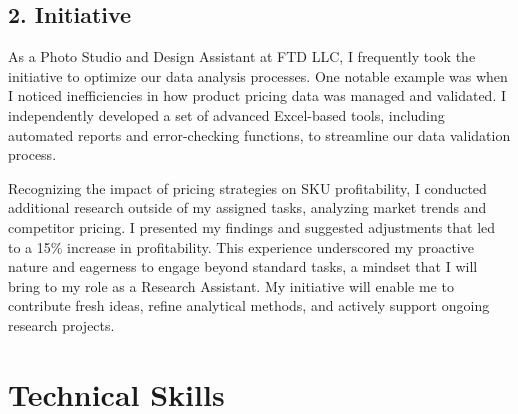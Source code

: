 \documentclass{article}
\begin{document}
\subsection*{2. Initiative}
As a Photo Studio and Design Assistant at FTD LLC, I frequently took the initiative to optimize our data analysis processes. One notable example was when I noticed inefficiencies in how product pricing data was managed and validated. I independently developed a set of advanced Excel-based tools, including automated reports and error-checking functions, to streamline our data validation process.

Recognizing the impact of pricing strategies on SKU profitability, I conducted additional research outside of my assigned tasks, analyzing market trends and competitor pricing. I presented my findings and suggested adjustments that led to a 15\% increase in profitability. This experience underscored my proactive nature and eagerness to engage beyond standard tasks, a mindset that I will bring to my role as a Research Assistant. My initiative will enable me to contribute fresh ideas, refine analytical methods, and actively support ongoing research projects.

\section*{Technical Skills}
\end{document}
